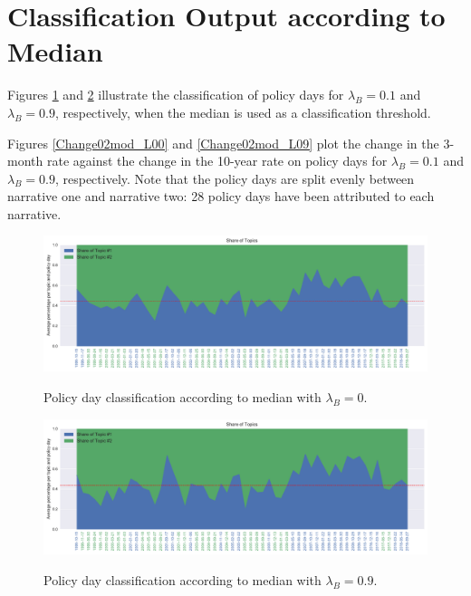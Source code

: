 \documentclass[11pt,a4paper,english,oneside]{book}
\numberwithin{equation}{chapter}
\begin{document}
\section{Classification Output according to Median}\label{AppendixE1}

Figures \ref{classPLSAmed} and \ref{classPLSAmed0_9} illustrate the classification of policy days for $\lambda_B = 0.1$ and $\lambda_B = 0.9$, respectively, when the median is used as a classification threshold. 

Figures \ref{Change02mod_L00} and \ref{Change02mod_L09} plot the change in the 3-month rate against the change in the 10-year rate on policy days for $\lambda_B = 0.1$ and $\lambda_B = 0.9$, respectively. Note that the policy days are split evenly between narrative one and narrative two: 28 policy days have been attributed to each narrative. 


\begin{figure}
	\caption{Policy day classification according to median with $\lambda_B = 0$.}
	\centering
	\includegraphics[scale=0.8]{Images/plsamodelling_bg_modLamb_0_0.pdf}
	\label{classPLSAmed}
\end{figure}


\begin{figure}
	\caption{Policy day classification according to median with $\lambda_B = 0.9$.}
	\centering
	\includegraphics[scale=0.8]{Images/plsamodelling_bg_modLamb_0_9.pdf}
	\label{classPLSAmed0_9}
\end{figure}
\end{document}
